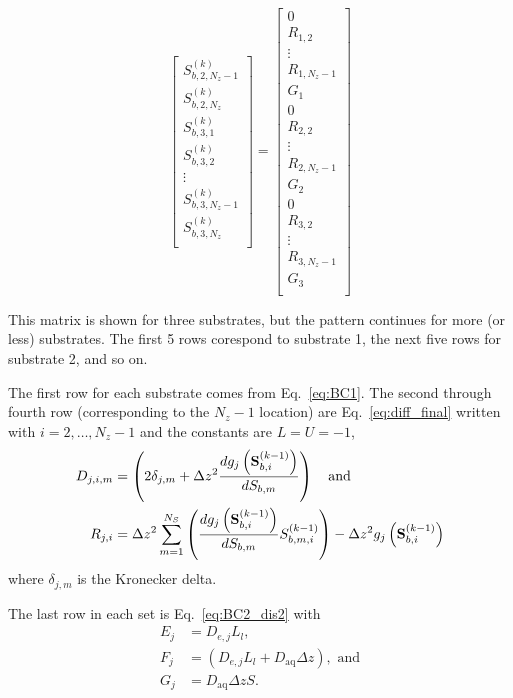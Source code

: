 \documentclass[letterpaper, twoside]{article}
\numberwithin{equation}{section}
\begin{document}
\begin{equation}
{\begin{bmatrix}
      S_{b,2,N_z-1}^{(k)}\\
      S_{b,2,N_z}^{(k)}\\
      S_{b,3,1}^{(k)}\\
      S_{b,3,2}^{(k)}\\
      \vdots\\
      S_{b,3,N_z-1}^{(k)}\\
      S_{b,3,N_z}^{(k)}\\
    \end{bmatrix}
    =
    \begin{bmatrix}
      0\\
      R_{1,2}\\
      \vdots\\
      R_{1,N_z-1}\\
      G_1 \\
      0\\
      R_{2,2}\\
      \vdots\\
      R_{2,N_z-1}\\
      G_2\\
      0\\
      R_{3,2}\\
      \vdots\\
      R_{3,N_z-1}\\
      G_3\\
    \end{bmatrix}
  }
\end{equation}

This matrix is shown for three substrates, but the pattern continues for more (or less) substrates.  The first 5 rows corespond to substrate 1, the next five rows for substrate 2, and so on.

The first row for each substrate comes from Eq.~\ref{eq:BC1}.
The second through fourth row (corresponding to the $N_z-1$ location) are Eq.~\ref{eq:diff_final} written with $i=2,\dots,N_z-1$ and the constants are $L=U=-1$,
\begin{align*}
  D_{j,i,m}&=\left( 2 \delta_{j,m} +\Delta z^2\frac{d g_j\left(\mathbf{S}_{b,i}^{(k-1)}\right)}{d S_{b,m}}\right)\text{\quad and}\\
  R_{j,i}   &= \Delta z^2\sum_{m=1}^{N_S} \left( \frac{d g_j\left(\mathbf{S}_{b,i}^{(k-1)}\right)}{d S_{b,m}}  S_{b,m,i}^{(k-1)}\right) - \Delta z^2 g_j\left(\mathbf{S}_{b,i}^{(k-1)}\right) 
\end{align*}
where $\delta_{j,m}$ is the Kronecker delta.

The last row in each set is Eq.~\ref{eq:BC2_dis2} with
\begin{align}
  E_j&=D_{e,j} L_l,\\
  F_j&=\left(D_{e,j} L_l + D_{\mathrm{aq}} \Delta z\right),\text{ and}\\
  G_j&=D_{\mathrm{aq}} \Delta z S.
\end{align}
\end{document}

